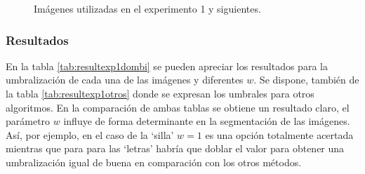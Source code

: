 \begin{figure}
    \quad
    \caption{Imágenes utilizadas en el experimento 1 y siguientes.}
    \label{fig:imagenes}
\end{figure}


\subsubsection{Resultados}
En la tabla \ref{tab:resultexp1dombi} se pueden apreciar los resultados para la umbralización de cada una de las imágenes y diferentes $w$. Se dispone, también de la tabla \ref{tab:resultexp1otros} donde se expresan los umbrales para otros algoritmos. En la comparación de ambas tablas se obtiene un resultado claro, el parámetro $w$ influye de forma determinante en la segmentación de las imágenes. Así, por ejemplo, en el caso de la `silla' $w=1$ es una opción totalmente acertada mientras que para para las `letras' habría que doblar el valor para obtener una umbralización igual de buena en comparación con los otros métodos.

